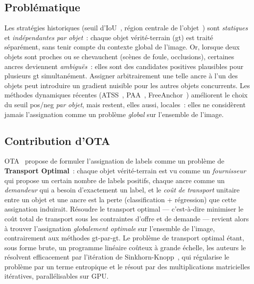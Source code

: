\documentclass[11pt,a4paper]{article}
\begin{document}
\subsection{Problématique}
Les stratégies historiques (seuil d'IoU~\cite{ren2015faster,lin2017focal}, région centrale de l'objet~\cite{tian2019fcos}) sont \emph{statiques} et \emph{indépendantes par objet}~: chaque objet vérité-terrain (gt) est traité séparément, sans tenir compte du contexte global de l'image. Or, lorsque deux objets sont proches ou se chevauchent (scènes de foule, occlusions), certaines ancres deviennent \emph{ambiguës}~: elles sont des candidates positives plausibles pour plusieurs gt simultanément. Assigner arbitrairement une telle ancre à l'un des objets peut introduire un gradient nuisible pour les autres objets concurrents. Les méthodes dynamiques récentes (ATSS~\cite{zhang2020atss}, PAA~\cite{kim2020paa}, FreeAnchor~\cite{zhang2019freeanchor}) améliorent le choix du seuil pos/neg \emph{par objet}, mais restent, elles aussi, locales~: elles ne considèrent jamais l'assignation comme un problème \emph{global} sur l'ensemble de l'image.

\subsection{Contribution d'OTA}
OTA~\cite{ge2021ota} propose de formuler l'assignation de labels comme un problème de \textbf{Transport Optimal}~: chaque objet vérité-terrain est vu comme un \emph{fournisseur} qui propose un certain nombre de labels positifs, chaque ancre comme un \emph{demandeur} qui a besoin d'exactement un label, et le \emph{coût de transport} unitaire entre un objet et une ancre est la perte (classification + régression) que cette assignation induirait. Résoudre le transport optimal --- c'est-à-dire minimiser le coût total de transport sous les contraintes d'offre et de demande --- revient alors à trouver l'assignation \emph{globalement optimale} sur l'ensemble de l'image, contrairement aux méthodes gt-par-gt. Le problème de transport optimal étant, sous forme brute, un programme linéaire coûteux à grande échelle, les auteurs le résolvent efficacement par l'itération de Sinkhorn-Knopp~\cite{cuturi2013sinkhorn}, qui régularise le problème par un terme entropique et le résout par des multiplications matricielles it\'eratives, parallélisables sur GPU.
\end{document}
